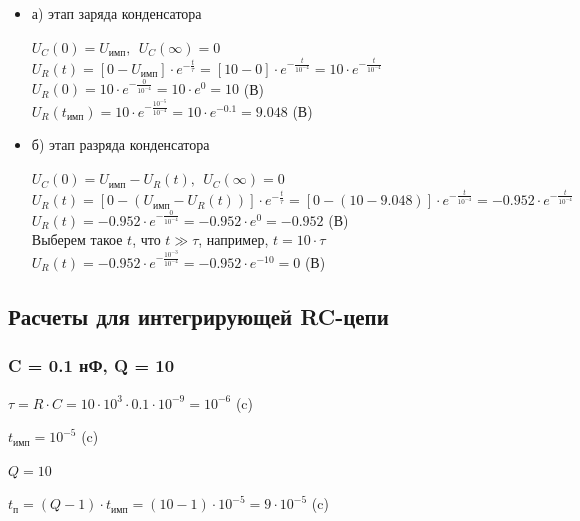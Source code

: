 \begin{itemize}
\item[] а) этап заряда конденсатора

		$U_C(0)	= U_\text{имп},\ \ U_C(\infty) = 0$\\		
		$U_R(t) = [0 - U_\text{имп}] \cdot e^{-\frac{t}{\tau}} = [10 - 0] \cdot e^{-\frac{t}{10^{-4}}} = 10 \cdot e^{-\frac{t}{10^{-4}}}$\\
		$U_R(0) = 10 \cdot e^{-\frac{0}{10^{-4}}} = 10 \cdot e^0 = 10$ (В)\\
		$U_R(t_\text{имп}) = 10 \cdot e^{-\frac{10^{-5}}{10^{-4}}} = 10 \cdot e^{-0.1} = 9.048$ (В)\\

\item[] б) этап разряда конденсатора
		
		$U_C(0)	= U_\text{имп} - U_R(t),\ \ U_C(\infty) = 0$\\
		$U_R(t) = [0 - (U_\text{имп} - U_R(t))] \cdot e^{-\frac{t}{\tau}} = [0 - (10 - 9.048)] \cdot e^{-\frac{t}{10^{-4}}} = -0.952 \cdot e^{-\frac{t}{10^{-4}}}$\\
		$U_R(t) = -0.952 \cdot e^{-\frac{0}{10^{-4}}} = -0.952 \cdot e^0 = -0.952$ (В)\\
		Выберем такое $t$, что $t \gg \tau$, например, $t = 10 \cdot \tau$ \\
		$U_R(t) = -0.952 \cdot e^{-\frac{10^{-3}}{10^{-4}}} = -0.952 \cdot e^{-10} = 0$ (В)\\
		
\end{itemize}

\subsection{Расчеты для интегрирующей RC-цепи}

\subsubsection{C = 0.1 нФ, Q = 10}

		$\tau = R \cdot C = 10 \cdot 10^3 \cdot 0.1 \cdot 10^{-9} = 10^{-6}$ (c)
		
		$t_\text{имп} = 10^{-5}$ (c)
		
		$Q = 10$		
		
		$t_\text{п} = (Q - 1) \cdot t_\text{имп} = (10 - 1) \cdot 10^{-5} = 9 \cdot 10^{-5}$ (c)
		
